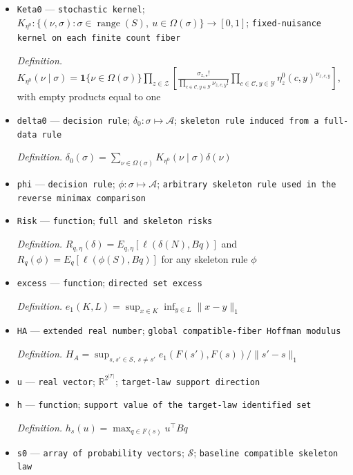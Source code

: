 \documentclass{article}
\begin{document}
\begin{itemize}
  \item \texttt{Keta0} --- \texttt{stochastic kernel}; \(K_{\eta^0}:\{(\nu,\sigma):\sigma\in\operatorname{range}(S),\ 
u\in\Omega(\sigma)\}\to[0,1]\); \texttt{fixed-\allowbreak{}nuisance kernel on each finite count fiber}
  \par\smallskip\noindent\emph{Definition.} \(K_{\eta^0}(\nu\mid\sigma)=\mathbf 1\{\nu\in\Omega(\sigma)\}\prod_{z\in\mathcal Z}\left[\frac{\sigma_{z,\star}!}{\prod_{c\in\mathcal C,y\in\mathcal Y}\nu_{z,c,y}!}\prod_{c\in\mathcal C,y\in\mathcal Y}\eta^0_z(c,y)^{\nu_{z,c,y}}\right]\), with empty products equal to one
  \item \texttt{delta0} --- \texttt{decision rule}; \(\delta_0:\sigma\mapsto\mathcal A\); \texttt{skeleton rule induced from a full-\allowbreak{}data rule}
  \par\smallskip\noindent\emph{Definition.} \(\delta_0(\sigma)=\sum_{\nu\in\Omega(\sigma)}K_{\eta^0}(\nu\mid\sigma)\delta(\nu)\)
  \item \texttt{phi} --- \texttt{decision rule}; \(\phi:\sigma\mapsto\mathcal A\); \texttt{arbitrary skeleton rule used in the reverse minimax comparison}
  \item \texttt{Risk} --- \texttt{function}; \texttt{full and skeleton risks}
  \par\smallskip\noindent\emph{Definition.} \(R_{q,\eta}(\delta)=E_{q,\eta}[\ell(\delta(N),Bq)]\) and \(R_q(\phi)=E_q[\ell(\phi(S),Bq)]\) for any skeleton rule \(\phi\)
  \item \texttt{excess} --- \texttt{function}; \texttt{directed set excess}
  \par\smallskip\noindent\emph{Definition.} \(e_1(K,L)=\sup_{x\in K}\inf_{y\in L}\|x-y\|_1\)
  \item \texttt{HA} --- \texttt{extended real number}; \texttt{global compatible-\allowbreak{}fiber Hoffman modulus}
  \par\smallskip\noindent\emph{Definition.} \(H_A=\sup_{s,s'\in\mathcal S,\ s\ne s'} e_1(F(s'),F(s))/\|s'-s\|_1\)
  \item \texttt{u} --- \texttt{real vector}; \(\mathbb R^{2^{|\mathcal T|}}\); \texttt{target-\allowbreak{}law support direction}
  \item \texttt{h} --- \texttt{function}; \texttt{support value of the target-\allowbreak{}law identified set}
  \par\smallskip\noindent\emph{Definition.} \(h_s(u)=\max_{q\in F(s)}u^\top Bq\)
  \item \texttt{s0} --- \texttt{array of probability vectors}; \(\mathcal S\); \texttt{baseline compatible skeleton law}

\end{itemize}
\end{document}
